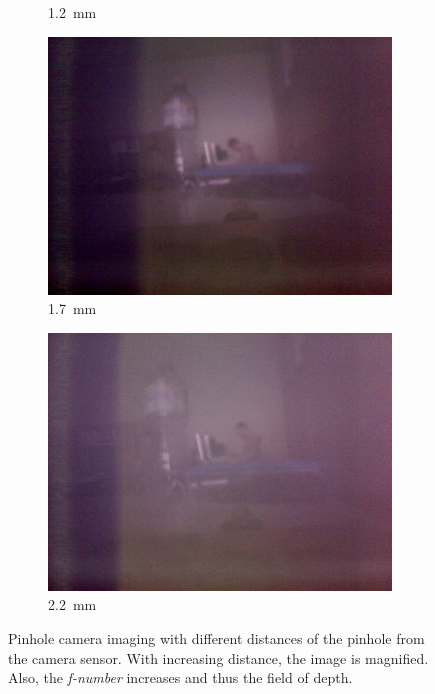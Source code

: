 \documentclass[a4paper, 12pt]{paper}
\begin{document}
\begin{figure}[H]
\begin{subfigure}[t]{0.45\textwidth}
        \caption{\SI{1.2}{\milli\meter}}
    \end{subfigure}
    \begin{subfigure}[t]{0.45\textwidth}
        \includegraphics[width=\textwidth]{img/10mm}
        \caption{\SI{1.7}{\milli\meter}}
    \end{subfigure}
    \begin{subfigure}[t]{0.45\textwidth}
        \includegraphics[width=\textwidth]{img/15mm}
        \caption{\SI{2.2}{\milli\meter}}
    \end{subfigure}
    \caption{Pinhole camera imaging with different distances of the pinhole from the camera sensor. With increasing distance, the image is magnified.
        Also, the \emph{f-number} increases and thus the field of depth.}
\label{fig:imaging}
\end{figure}
\end{document}
